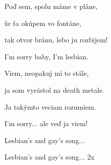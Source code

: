 \begin{song}
\bigskip

Poď sem, spolu máme v pláne, \par
{}že ťa okúpem vo fontáne, \par
{}tak otvor bránu, lebo ju rozbijem! \par
{}I'm sorry baby, I'm lesbian. \par

\bigskip

Viem, neopakuj mi to stále, \par
{}ja som vyrástol na death metale. \par
{}Ja takýmto veciam rozumiem. \par
{}I'm sorry... ale veď ja viem! \par

\bigskip

 Lesbian's and gay's  song...  \par
{} Lesbian's and gay's  song...  2x \par

\end{song}